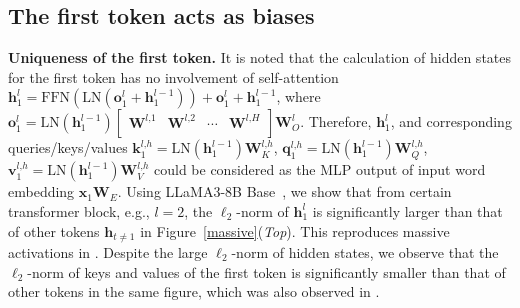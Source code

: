 \subsection{The first token acts as biases}\label{section3_1}
\vspace{-.1cm}
\textbf{Uniqueness of the first token.} It is noted that the calculation of hidden states for the first token has no involvement of self-attention $\boldsymbol{h}_1^{l}=\textrm{FFN}(\textrm{LN}(\boldsymbol{o}_1^l + \boldsymbol{h}_1^{l-1})) +  \boldsymbol{o}_1^l + \boldsymbol{h}_1^{l-1}$, where $\boldsymbol{o}_1^l=\textrm{LN}(\boldsymbol{h}_1^{l-1})\begin{bmatrix}
    \boldsymbol{W}^{l\textrm{,}1} & \boldsymbol{W}^{l\textrm{,}2} & \cdots & \boldsymbol{W}^{l\textrm{,}H}\\
\end{bmatrix}\boldsymbol{W}_{O}^l$. Therefore, $\boldsymbol{h}_1^l$, and corresponding queries/keys/values $\boldsymbol{k}_1^{l\textrm{,}h}=\textrm{LN}(\boldsymbol{h}_1^{l-1})\boldsymbol{W}_{K}^{l\textrm{,}h}$, $\boldsymbol{q}_1^{l\textrm{,}h}=\textrm{LN}(\boldsymbol{h}_1^{l-1})\boldsymbol{W}_{Q}^{l\textrm{,}h}$, $\boldsymbol{v}_1^{l\textrm{,}h}=\textrm{LN}(\boldsymbol{h}_1^{l-1})\boldsymbol{W}_{V}^{l\textrm{,}h}$ could be considered as the MLP output of input word embedding $\boldsymbol{x}_1\boldsymbol{W}_E$. Using LLaMA3-8B Base~\citep{dubey2024llama}, we show that from certain transformer block, e.g., $l=2$, the $\ell_2$-norm of $\boldsymbol{h}_1^l$ is significantly larger than that of other tokens $\boldsymbol{h}_{t\neq 1}$ in Figure~\ref{massive}(\emph{Top}). This reproduces massive activations in \citet{cancedda2024spectral,sun2024massive}. Despite the large $\ell_2$-norm of hidden states, we observe that the $\ell_2$-norm of keys and values of the first token is significantly smaller than that of other tokens in the same figure, which was also observed in \citet{devoto2024simple, guo2024attention}. 



